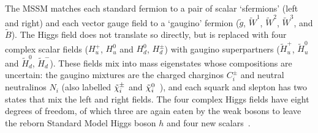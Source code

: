 The MSSM matches each standard fermion to a pair of scalar
`sfermions' (left and right)
and each vector gauge field to a `gaugino' fermion
($\tilde g$, $\tilde W^1$, $\tilde W^2$, $\tilde W^3$, and $\tilde B$).
The Higgs field does not translate so directly, but is replaced with four
complex scalar fields
($H^+_u$, $H^0_u$ and $H^0_d$, $H^\pm_d$) with
gaugino superpartners
($\tilde H^+_u$, $\tilde H^0_u$ and $\tilde H^0_d$, $\tilde H^-_d$).
These fields mix into mass eigenstates whose compositions are uncertain:
the gaugino mixtures are the charged charginos $C^\pm_i$ and
neutral neutralinos $N_i$
(also labelled $\tilde\chi^\pm_i$ and $\tilde\chi^0_i$~\cite{atlas2022searches}),
and each squark and slepton has two states that mix the left and right fields.
The four complex Higgs fields have eight degrees of freedom, of which three are
again eaten by the weak bosons to leave the reborn Standard Model Higgs boson $h$
and four new scalars~\cite{martin2016primer}.

